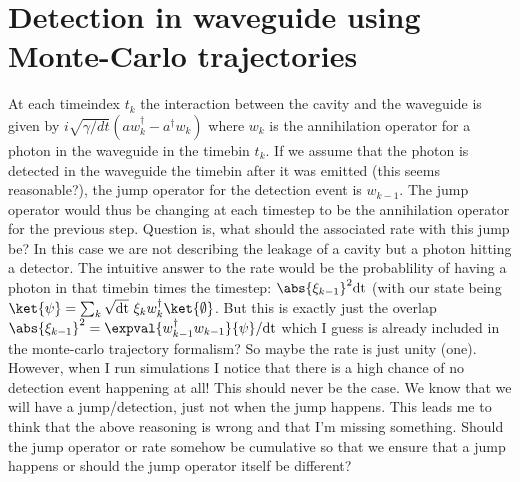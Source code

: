 \section{Detection in waveguide using Monte-Carlo trajectories}

At each timeindex $t_k$ the interaction between the cavity and the waveguide is given by $i \sqrt{\gamma/dt} ( a w_k^\dagger - a^\dagger w_k)$ where $w_k$ is the annihilation operator for a photon in the waveguide in the timebin $t_k$. If we assume that the photon is detected in the waveguide the timebin after it was emitted (this seems reasonable?), the jump operator for the detection event is $w_{k-1}$. The jump operator would thus be changing at each timestep to be the annihilation operator for the previous step. Question is, what should the associated rate with this jump be? In this case we are not describing the leakage of a cavity but a photon hitting a detector. The intuitive answer to the rate would be the probablility of having a photon in that timebin times the timestep: $\abs{\xi_{k-1}}^2 \mathrm{dt}$ (with our state being $\ket{\psi}=\sum_k \sqrt{\mathrm{dt}}\ \xi_k w_k^\dagger \ket{\emptyset}$. But this is exactly just the overlap $\abs{\xi_{k-1}}^2=\expval{w_{k-1}^\dagger w_{k-1} }{\psi}/\mathrm{dt}$ which I guess is already included in the monte-carlo trajectory formalism? So maybe the rate is just unity (one). However, when I run simulations I notice that there is a high chance of no detection event happening at all! This should never be the case. We know that we will have a jump/detection, just not when the jump happens. This leads me to think that the above reasoning is wrong and that I'm missing something. Should the jump operator or rate somehow be cumulative so that we ensure that a jump happens or should the jump operator itself be different?

